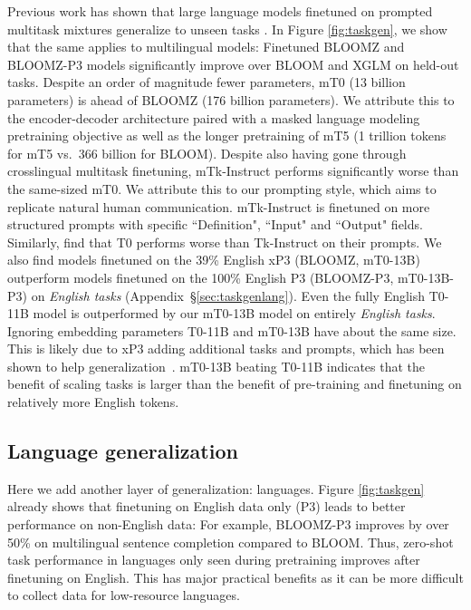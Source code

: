 \documentclass[11pt]{article}
\begin{document}
Previous work has shown that large language models finetuned on prompted multitask mixtures generalize to unseen tasks \cite{zhong2021adapting,wei2021finetuned,mishra2021,mishra2021cross,wang2022super}. In Figure \ref{fig:taskgen}, we show that the same applies to multilingual models: Finetuned BLOOMZ and BLOOMZ-P3 models significantly improve over BLOOM and XGLM on held-out tasks. Despite an order of magnitude fewer parameters, mT0 (13 billion parameters) is ahead of BLOOMZ (176 billion parameters). We attribute this to the encoder-decoder architecture paired with a masked language modeling pretraining objective \cite{wang2022language,tay2022unifying} as well as the longer pretraining of mT5 \cite{hoffmann2022training,su2022welm} (1 trillion tokens for mT5 vs.\ 366 billion for BLOOM). Despite also having gone through crosslingual multitask finetuning, mTk-Instruct performs significantly worse than the same-sized mT0. We attribute this to our prompting style, which aims to replicate natural human communication. mTk-Instruct is finetuned on more structured prompts with specific ``Definition", ``Input" and ``Output" fields. Similarly, \citet{wang2022super} find that T0 performs worse than Tk-Instruct on their prompts. We also find models finetuned on the 39\% English xP3 (BLOOMZ, mT0-13B) outperform models finetuned on the 100\% English P3 (BLOOMZ-P3, mT0-13B-P3) on \emph{English tasks} (Appendix~\S\ref{sec:taskgenlang}). Even the fully English T0-11B model \cite{sanh2022multitask} is outperformed by our mT0-13B model on entirely \emph{English tasks}. Ignoring embedding parameters T0-11B and mT0-13B have about the same size. This is likely due to xP3 adding additional tasks and prompts, which has been shown to help generalization~\cite{chung2022scaling,iyer2022opt}. mT0-13B beating T0-11B indicates that the benefit of scaling tasks is larger than the benefit of pre-training and finetuning on relatively more English tokens. 

\subsection{Language generalization}
\label{sec:langgen}

Here we add another layer of generalization: languages. Figure \ref{fig:taskgen} already shows that finetuning on English data only (P3) leads to better performance on non-English data: For example, BLOOMZ-P3 improves by over 50\% on multilingual sentence completion compared to BLOOM. Thus, zero-shot task performance in languages only seen during pretraining improves after finetuning on English. This has major practical benefits as it can be more difficult to collect data for low-resource languages.
\end{document}
